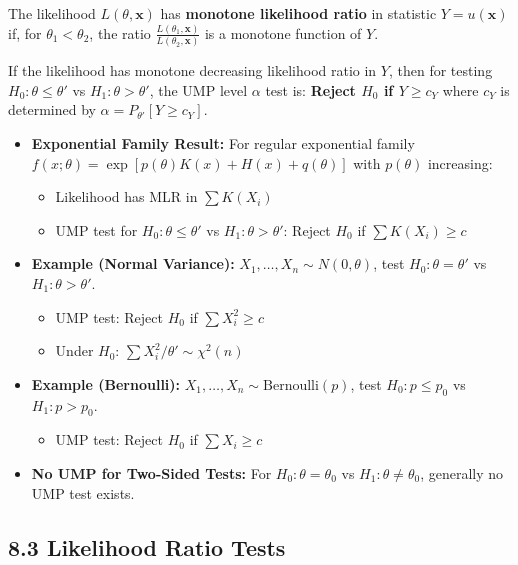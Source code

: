 \begin{definition}
The likelihood $L(\theta, \mathbf{x})$ has \textbf{monotone likelihood ratio} in statistic $Y = u(\mathbf{x})$ if, for $\theta_1 < \theta_2$, the ratio $\frac{L(\theta_1, \mathbf{x})}{L(\theta_2, \mathbf{x})}$ is a monotone function of $Y$.
\end{definition}
\begin{theorem}
If the likelihood has monotone decreasing likelihood ratio in $Y$, then for testing $H_0: \theta \leq \theta'$ vs $H_1: \theta > \theta'$, the UMP level $\alpha$ test is:
\textbf{Reject $H_0$ if $Y \geq c_Y$}
where $c_Y$ is determined by $\alpha = P_{\theta'}[Y \geq c_Y]$.
\end{theorem}
\begin{itemize}
	\item \textbf{Exponential Family Result:} For regular exponential family $f(x; \theta) = \exp[p(\theta)K(x) + H(x) + q(\theta)]$ with $p(\theta)$ increasing:
	\begin{itemize}
		\item Likelihood has MLR in $\sum K(X_i)$
		\item UMP test for $H_0: \theta \leq \theta'$ vs $H_1: \theta > \theta'$: Reject $H_0$ if $\sum K(X_i) \geq c$
	\end{itemize}
	\item \textbf{Example (Normal Variance):} $X_1, \ldots, X_n \sim N(0, \theta)$, test $H_0: \theta = \theta'$ vs $H_1: \theta > \theta'$.
	\begin{itemize}
		\item UMP test: Reject $H_0$ if $\sum X_i^2 \geq c$
		\item Under $H_0$: $\sum X_i^2/\theta' \sim \chi^2(n)$
	\end{itemize}
	\item \textbf{Example (Bernoulli):} $X_1, \ldots, X_n \sim \text{Bernoulli}(p)$, test $H_0: p \leq p_0$ vs $H_1: p > p_0$.
	\begin{itemize}
		\item UMP test: Reject $H_0$ if $\sum X_i \geq c$
	\end{itemize}
	\item \textbf{No UMP for Two-Sided Tests:} For $H_0: \theta = \theta_0$ vs $H_1: \theta \neq \theta_0$, generally no UMP test exists.
\end{itemize}

\subsection{8.3 Likelihood Ratio Tests}

